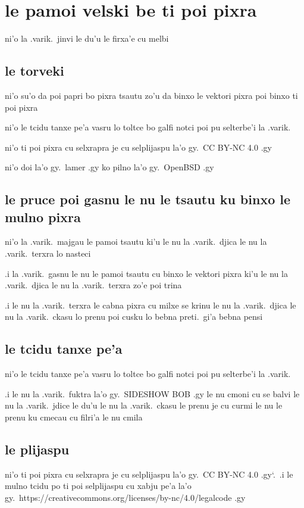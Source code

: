 \documentclass{report}
\newcommand\sds{\spacefactor\sfcode`.\ \space}
\begin{document}
\section{le pamoi velski be ti poi pixra}
ni'o la .varik.\ jinvi le du'u le firxa'e cu melbi

\subsection{le torveki}
ni'o su'o da poi papri bo pixra tsautu zo'u da binxo le vektori pixra poi binxo ti poi pixra

ni'o le tcidu tanxe pe'a vasru lo toltce bo galfi notci poi pu selterbe'i la .varik.

ni'o ti poi pixra cu selxrapra je cu selplijaspu la'o gy.\ CC BY-NC 4.0 .gy

ni'o doi la'o gy.\ lamer .gy ko pilno la'o gy.\ OpenBSD .gy

\subsection{le pruce poi gasnu le nu le tsautu ku binxo le mulno pixra}
ni'o la .varik.\ majgau le pamoi tsautu ki'u le nu la .varik.\ djica le nu la .varik.\ terxra lo nasteci

.i la .varik.\ gasnu le nu le pamoi tsautu cu binxo le vektori pixra ki'u le nu la .varik.\ djica le nu la .varik.\ terxra zo'e poi trina

.i le nu la .varik.\ terxra le cabna pixra cu milxe se krinu le nu la .varik.\ djica le nu la .varik.\ ckasu lo prenu poi cusku lo bebna preti.\ gi'a bebna pensi

\subsection{le tcidu tanxe pe'a}
ni'o le tcidu tanxe pe'a vasru lo toltce bo galfi notci poi pu selterbe'i la .varik.

.i le nu la .varik.\ fuktra la'o gy.\ SIDESHOW BOB .gy le nu cmoni cu se balvi le nu la .varik.\ jdice le du'u le nu la .varik.\ ckasu le prenu je cu curmi le nu le prenu ku cmecau cu filri'a le nu cmila

\subsection{le plijaspu}
ni'o ti poi pixra cu selxrapra je cu selplijaspu la'o gy.\ CC BY-NC 4.0 .gy\sds  .i le mulno tcidu po ti poi selplijaspu cu xabju pe'a la'o gy.\ https://creativecommons.org/licenses/by-nc/4.0/legalcode .gy
\end{document}
